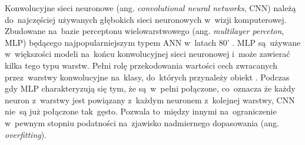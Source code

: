 Konwolucyjne sieci neuronowe (ang. \textit{convolutional neural networks}, CNN) należą do~najczęściej używanych głębokich sieci neuronowych w~wizji komputerowej. Zbudowane na~bazie perceptonu wielowarstwowego (ang. \textit{multilayer perceton}, MLP) będącego  najpopularniejszym typem ANN w~latach 80' \cite{deep_learning, Wasserman1988NeuralNI}. MLP są~używane w~większości modeli na~końcu konwolucyjnej sieci neuronowej i~może zawierać kilka tego typu warstw. Pełni rolę przekodowania wartości cech zwracanych przez~warstwy konwolucyjne na~klasy, do~których przynależy obiekt \cite{Krizhevsky2012ImageNetCW}. Podczas gdy MLP charakteryzują się tym, że są~w~pełni połączone, co~oznacza że każdy neuron z~warstwy jest powiązany z~każdym neuronem z~kolejnej warstwy, CNN nie~są już połączone tak~gęsto. Pozwala to~między innymi na~ograniczenie w~pewnym stopniu podatności na~zjawisko nadmiernego dopasowania (ang. \textit{overfitting}). 

